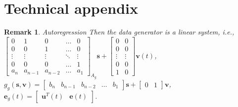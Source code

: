 \documentclass{ifacconf}
\def\rve{{\mathbf{e}}}
\def\rvu{{\mathbf{i}}}
\def\rvu{{\mathbf{u}}}
\def\vs{{\bm{s}}}
\def\vv{{\bm{v}}}
\newtheorem{Remark}{Remark}[section]
\begin{document}



\appendix
\section{Technical appendix}
\begin{Remark}{Autoregression}
Then the data generator is a linear system, i.e.,
\(\begin{bmatrix} 
0 & 1 & 0 & \dots & 0 \\  
0 & 0 & 1 & \dots & 0 \\  
\vdots & \vdots & \vdots & \ddots & \vdots \\  
0 & 0 & 0 & \dots & 1 \\  
a_n & a_{n-1} & a_{n-2} & \dots & a_1 
\end{bmatrix}_{A_g}
\vs
+ 
\begin{bmatrix} 
0 & 0\\ 
0 & 0\\ 
\vdots & \vdots\\ 
0 & 0\\ 
1 & 0
\end{bmatrix} 
\vv(t) \), 
\(g_g(\vs,\vv)= 
\begin{bmatrix} 
b_n & b_{n-1} & b_{n-2} & \dots & b_1 
\end{bmatrix}\vs+\begin{bmatrix} 0 & 1 \end{bmatrix}\vv \),
$\rve_g(t)=\begin{bmatrix} \rvu^T(t) & \rve(t) \end{bmatrix}$.


\end{Remark}
\end{document}
